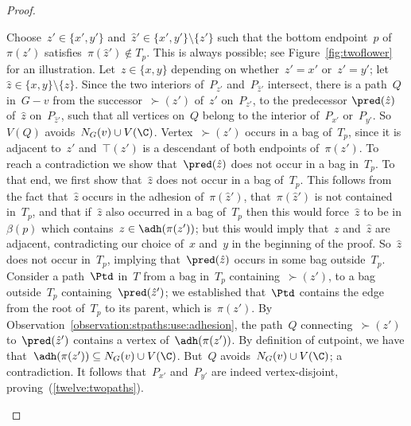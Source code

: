 \begin{proof}
\begin{claimproof}
Choose~$z' \in \{x',y'\}$ and~$\hat{z}' \in \{x',y'\} \setminus \{z'\}$ such that the bottom endpoint~$p$ of~$\pi(z')$ satisfies~$\pi(\hat{z}') \not \in T_p$. This is always possible; see Figure~\ref{fig:twoflower} for an illustration. Let~$z \in \{x,y\}$ depending on whether~$z' = x'$ or~$z' = y'$; let~$\hat{z} \in \{x,y\} \setminus \{z\}$. Since the two interiors of~$P_{z'}$ and~$P_{\hat{z}'}$ intersect, there is a path~$Q$ in~$G-v$ from the successor~$\succ(z')$ of~$z'$ on~$P_{z'}$, to the predecessor$~\pred(\hat{z})$ of~$\hat{z}$ on~$P_{\hat{z}'}$, such that all vertices on~$Q$ belong to the interior of~$P_{x'}$ or~$P_{y'}$. So~$V(Q)$ avoids~$N_G(v) \cup V(\C)$. Vertex~$\succ(z')$ occurs in a bag of~$T_p$, since it is adjacent to~$z'$ and~$\top(z')$ is a descendant of both endpoints of~$\pi(z')$. To reach a contradiction we show that~$\pred(\hat{z})$ does not occur in a bag in~$T_p$. To that end, we first show that~$\hat{z}$ does not occur in a bag of~$T_p$. This follows from the fact that~$\hat{z}$ occurs in the adhesion of~$\pi(\hat{z}')$, that~$\pi(\hat{z}')$ is not contained in~$T_p$, and that if~$\hat{z}$ also occurred in a bag of~$T_p$ then this would force~$\hat{z}$ to be in~$\beta(p)$ which contains~$z \in \adh(\pi(z'))$; but this would imply that~$z$ and~$\hat{z}$ are adjacent, contradicting our choice of~$x$ and~$y$ in the beginning of the proof. So~$\hat{z}$ does not occur in~$T_p$, implying that~$\pred(\hat{z})$ occurs in some bag outside~$T_p$. Consider a path~$\Ptd$ in~$T$ from a bag in~$T_p$ containing~$\succ(z')$, to a bag outside~$T_p$ containing~$\pred(\hat{z}')$; we established that~$\Ptd$ contains the edge from the root of~$T_p$ to its parent, which is~$\pi(z')$. By Observation~\ref{observation:stpaths:use:adhesion}, the path~$Q$ connecting~$\succ(z')$ to~$\pred(\hat{z}')$ contains a vertex of~$\adh(\pi(z'))$. By definition of cutpoint, we have that~$\adh(\pi(z')) \subseteq N_G(v) \cup V(\C)$. But~$Q$ avoids~$N_G(v) \cup V(\C)$; a contradiction. It follows that~$P_{x'}$ and~$P_{y'}$ are indeed vertex-disjoint, proving~(\ref{twelve:twopaths}).


\end{claimproof}
\end{proof}
